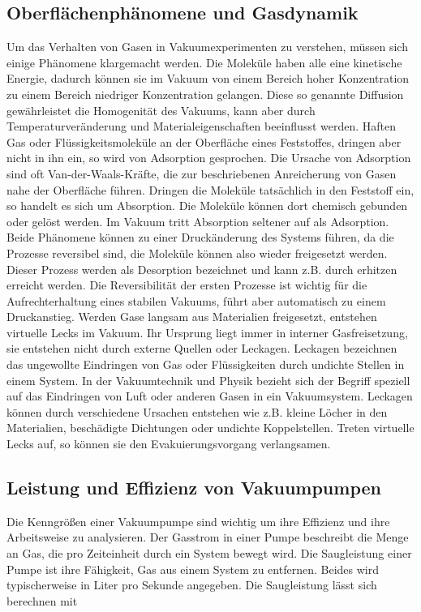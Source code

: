 \subsection{Oberflächenphänomene und Gasdynamik}


Um das Verhalten von Gasen in Vakuumexperimenten zu verstehen, müssen sich einige Phänomene klargemacht werden.
Die Moleküle haben alle
eine kinetische Energie, dadurch können sie im Vakuum von einem Bereich hoher Konzentration zu einem Bereich niedriger Konzentration 
gelangen. Diese so genannte Diffusion gewährleistet die Homogenität des Vakuums, kann aber durch Temperaturveränderung und Materialeigenschaften
beeinflusst werden. Haften Gas oder Flüssigkeitsmoleküle an der Oberfläche eines Feststoffes, dringen aber nicht in ihn ein, so wird 
von Adsorption gesprochen. Die Ursache von Adsorption sind oft Van-der-Waals-Kräfte, die zur beschriebenen Anreicherung von Gasen nahe der Oberfläche führen.
Dringen die Moleküle tatsächlich in den Feststoff ein, so handelt es sich um Absorption. Die Moleküle können dort chemisch gebunden oder 
gelöst werden. Im Vakuum tritt Absorption seltener auf als Adsorption. Beide Phänomene können zu einer Druckänderung des Systems führen,
da die Prozesse reversibel sind, die Moleküle können also wieder freigesetzt werden. Dieser Prozess werden als Desorption bezeichnet und kann z.B. durch erhitzen
 erreicht werden. Die Reversibilität der ersten Prozesse ist wichtig für die Aufrechterhaltung eines stabilen Vakuums, führt aber automatisch zu einem Druckanstieg. 
Werden Gase langsam aus Materialien freigesetzt, entstehen virtuelle Lecks im Vakuum. Ihr Ursprung liegt immer in interner Gasfreisetzung, 
sie entstehen nicht durch externe Quellen oder Leckagen.
Leckagen bezeichnen das ungewollte Eindringen von Gas oder Flüssigkeiten durch undichte Stellen in einem System. In der Vakuumtechnik und Physik bezieht sich der Begriff
speziell auf das Eindringen von Luft oder anderen Gasen in ein Vakuumsystem. Leckagen können durch verschiedene Ursachen entstehen wie z.B.
kleine Löcher in den Materialien, beschädigte Dichtungen oder undichte Koppelstellen.
Treten virtuelle Lecks auf, so können sie den Evakuierungsvorgang verlangsamen.

\subsection{Leistung und Effizienz von Vakuumpumpen}


Die Kenngrößen einer Vakuumpumpe sind wichtig um ihre Effizienz und ihre Arbeitsweise zu analysieren.
Der Gasstrom in einer Pumpe beschreibt die Menge an Gas, die pro Zeiteinheit durch ein System bewegt wird. Die Saugleistung einer Pumpe ist ihre 
Fähigkeit, Gas aus einem System zu entfernen. Beides wird typischerweise in Liter pro Sekunde angegeben. Die Saugleistung lässt sich berechnen mit

